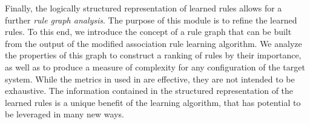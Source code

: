 Finally, the logically structured representation of learned rules allows for a further \textit{rule graph analysis}.
The purpose of this module is to refine the learned rules.
To this end, we introduce the concept of a rule graph that can be built from the output of the modified association rule learning algorithm.
We analyze the properties of this graph to construct a ranking of rules by their importance, 
  as well as to produce a measure of complexity for any configuration of the target system.
While the metrics in used in \app are effective, they are not intended to be exhaustive.
The information contained in the structured representation of the learned rules
  is a unique benefit of the learning algorithm, that has potential to be leveraged in many new ways.

